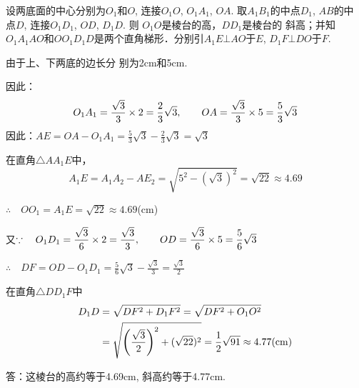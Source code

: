 \begin{figure}[htp]
    \centering
{}
    \caption{}
\end{figure}


\begin{solution}
设两底面的中心分别为$O_1$和$O$, 连接$O_1O$, $O_1A_1$,
 $OA$. 取$A_1B_1$的中点$D_1$, $AB$的中
点$D$, 连接$O_1D_1$, $OD$, $D_1D$. 则
$O_1O$是棱台的高，$DD_1$是棱台的
斜高；并知$O_1A_1AO$和$OO_1D_1D$是两个直角梯形．分别引$A_1E\bot
AO$于$E$, $D_1F\bot DO$于$F$. 

由于上、下两底的边长分
别为2cm和5cm.

因此：
\[O_1A_1=\frac{\sqrt{3}}{3}\x 2=\frac{2}{3}\sqrt{3}, \qquad  OA=\frac{\sqrt{3}}{3}\x 5=\frac{5}{3}\sqrt{3}\]
因此：$AE=OA-O_1A_1=\frac{5}{3}\sqrt{3}-\frac{2}{3}\sqrt{3}=\sqrt{3}$


在直角$\triangle AA_1E$中，
\[A_1E=A_1A_2-AE_2=\sqrt{5^2-(\sqrt{3})^2}=\sqrt{22}\approx 4.69\]

$\therefore\quad OO_1=A_1E=\sqrt{22}\approx 4.69$(cm)

又$\because\quad O_1D_1=\frac{\sqrt{3}}{6}\x 2=\frac{\sqrt{3}}{3},\qquad OD=\frac{\sqrt{3}}{6}\x 5=\frac{5}{6}{\sqrt{3}}$

$\therefore\quad DF=OD-O_1D_1=\frac{5}{6}{\sqrt{3}}-\frac{\sqrt{3}}{3}=\frac{\sqrt{3}}{2}$

在直角$\triangle DD_1F$中
\[\begin{split}
    D_1D&=\sqrt{DF^2+D_1F^2}=\sqrt{DF^2+O_1O^2}\\
&=\sqrt{\left(\frac{\sqrt{3}}{2}\right)^2+(\sqrt{22})^2}=\frac{1}{2}\sqrt{91}\approx 4.77({\rm cm})
\end{split}\]

答：这棱台的高约等于4.69cm, 斜高约等于4.77cm.
\end{solution}

